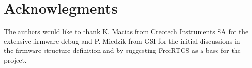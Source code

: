 \documentclass[a4paper,
              ]{jacow}
\begin{document}
\section{Acknowlegments}
The authors would like to thank K. Macias from Creotech Instruments SA for the extensive firmware debug and P. Miedzik from GSI for the initial discussions in the firmware structure definition and by suggesting FreeRTOS as a base for the project.


%
%
%
%
%

\end{document}
